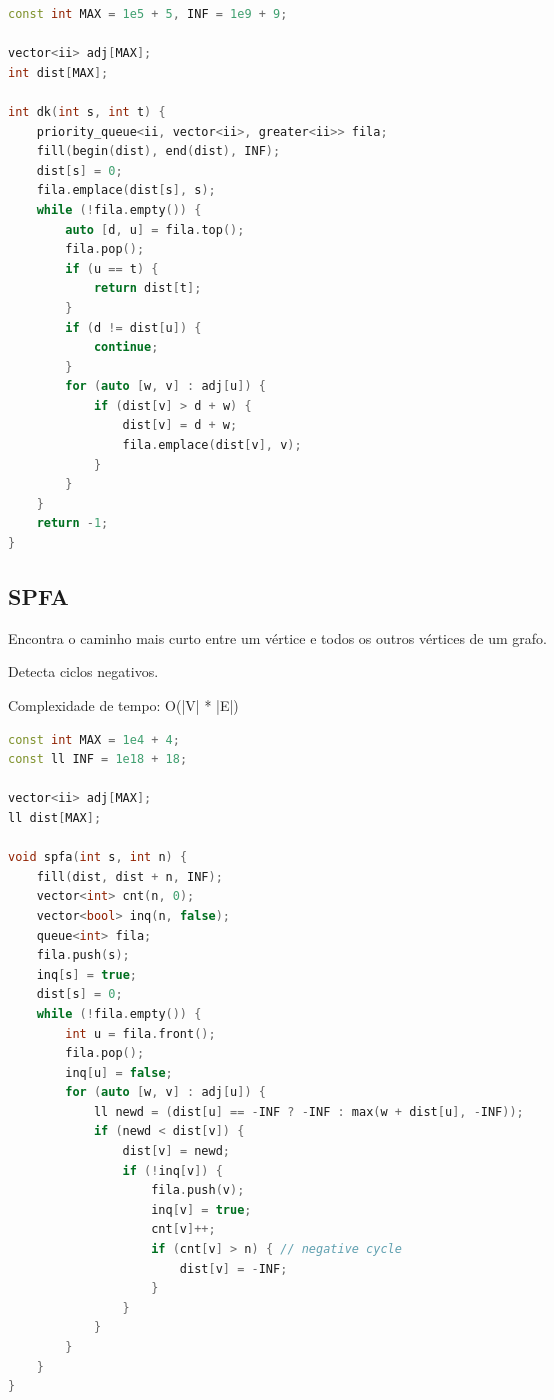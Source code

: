 \documentclass[11pt, a4paper, oneside]{book}
\begin{document}
\hfill

\begin{multicols}{2}
\begin{lstlisting}[language=C++]
const int MAX = 1e5 + 5, INF = 1e9 + 9;

vector<ii> adj[MAX];
int dist[MAX];

int dk(int s, int t) {
    priority_queue<ii, vector<ii>, greater<ii>> fila;
    fill(begin(dist), end(dist), INF);
    dist[s] = 0;
    fila.emplace(dist[s], s);
    while (!fila.empty()) {
        auto [d, u] = fila.top();
        fila.pop();
        if (u == t) {
            return dist[t];
        }
        if (d != dist[u]) {
            continue;
        }
        for (auto [w, v] : adj[u]) {
            if (dist[v] > d + w) {
                dist[v] = d + w;
                fila.emplace(dist[v], v);
            }
        }
    }
    return -1;
}
\end{lstlisting}
\end{multicols}

\hfill

\subsection{SPFA}


Encontra o caminho mais curto entre um vértice e todos os outros vértices de um grafo.



Detecta ciclos negativos.



Complexidade de tempo: O(|V| * |E|)

\hfill

\begin{multicols}{2}
\begin{lstlisting}[language=C++]
const int MAX = 1e4 + 4;
const ll INF = 1e18 + 18;

vector<ii> adj[MAX];
ll dist[MAX];

void spfa(int s, int n) {
    fill(dist, dist + n, INF);
    vector<int> cnt(n, 0);
    vector<bool> inq(n, false);
    queue<int> fila;
    fila.push(s);
    inq[s] = true;
    dist[s] = 0;
    while (!fila.empty()) {
        int u = fila.front();
        fila.pop();
        inq[u] = false;
        for (auto [w, v] : adj[u]) {
            ll newd = (dist[u] == -INF ? -INF : max(w + dist[u], -INF));
            if (newd < dist[v]) {
                dist[v] = newd;
                if (!inq[v]) {
                    fila.push(v);
                    inq[v] = true;
                    cnt[v]++;
                    if (cnt[v] > n) { // negative cycle
                        dist[v] = -INF;
                    }
                }
            }
        }
    }
}
\end{lstlisting}
\end{multicols}
\end{document}
